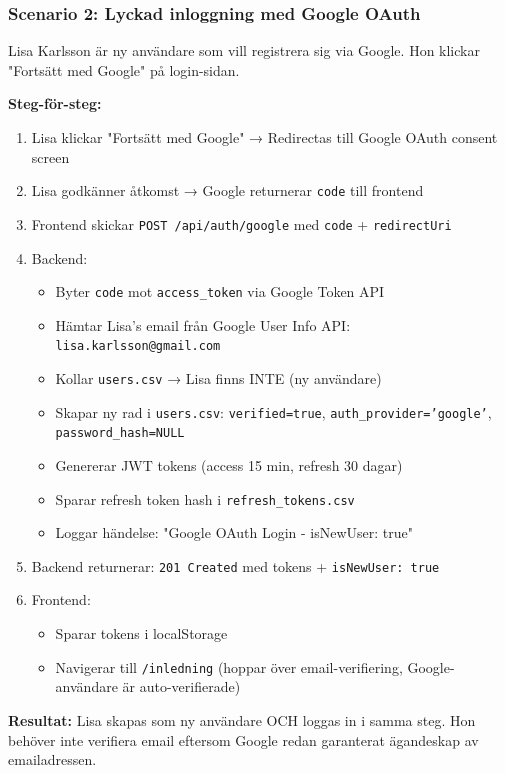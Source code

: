 \documentclass[12pt,a4paper]{article}
\begin{document}
\subsubsection{Scenario 2: Lyckad inloggning med Google OAuth}

Lisa Karlsson är ny användare som vill registrera sig via Google. Hon klickar "Fortsätt med Google" på login-sidan.

\textbf{Steg-för-steg:}
\begin{enumerate}[noitemsep]
  \item Lisa klickar "Fortsätt med Google" → Redirectas till Google OAuth consent screen
  \item Lisa godkänner åtkomst → Google returnerar \texttt{code} till frontend
  \item Frontend skickar \texttt{POST /api/auth/google} med \texttt{code} + \texttt{redirectUri}
  \item Backend:
  \begin{itemize}[noitemsep]
    \item Byter \texttt{code} mot \texttt{access\_token} via Google Token API
    \item Hämtar Lisa's email från Google User Info API: \texttt{lisa.karlsson@gmail.com}
    \item Kollar \texttt{users.csv} → Lisa finns INTE (ny användare)
    \item Skapar ny rad i \texttt{users.csv}: \texttt{verified=true}, \texttt{auth\_provider='google'}, \texttt{password\_hash=NULL}
    \item Genererar JWT tokens (access 15 min, refresh 30 dagar)
    \item Sparar refresh token hash i \texttt{refresh\_tokens.csv}
    \item Loggar händelse: "Google OAuth Login - isNewUser: true"
  \end{itemize}
  \item Backend returnerar: \texttt{201 Created} med tokens + \texttt{isNewUser: true}
  \item Frontend:
  \begin{itemize}[noitemsep]
    \item Sparar tokens i localStorage
    \item Navigerar till \texttt{/inledning} (hoppar över email-verifiering, Google-användare är auto-verifierade)
  \end{itemize}
\end{enumerate}

\textbf{Resultat:} Lisa skapas som ny användare OCH loggas in i samma steg. Hon behöver inte verifiera email eftersom Google redan garanterat ägandeskap av emailadressen.
\end{document}
